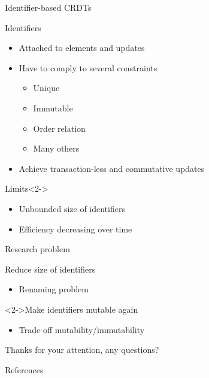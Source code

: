 \documentclass[10pt]{beamer}
\begin{document}
\begin{frame}{Identifier-based \acp{CRDT}}
  \begin{block}{Identifiers}
    \begin{itemize}
      \item Attached to elements and updates
      \item Have to comply to several constraints
      \begin{itemize}
        \item Unique
        \item Immutable
        \item Order relation
        \item Many others
      \end{itemize}
      \item Achieve transaction-less and commutative updates
    \end{itemize}
  \end{block}
  \begin{alertblock}{Limits}<2->
    \begin{itemize}
      \item Unbounded size of identifiers
      \item Efficiency decreasing over time
    \end{itemize}
  \end{alertblock}
\end{frame}

\begin{frame}{Research problem}
  \begin{block}{Reduce size of identifiers}
    \begin{itemize}
      \item Renaming problem\cite{AlistarhAGG2011}
    \end{itemize}
  \end{block}
  \begin{alertblock}<2->{Make identifiers mutable again}
    \begin{itemize}
      \item Trade-off mutability/immutability
    \end{itemize}
  \end{alertblock}
\end{frame}

\begin{frame}[standout]
  Thanks for your attention, any questions?
  \vspace{3em}
  \begin{center}
    \ccby
  \end{center}
\end{frame}


\begin{frame}[allowframebreaks]{References}
	
	
\end{frame}
\end{document}
